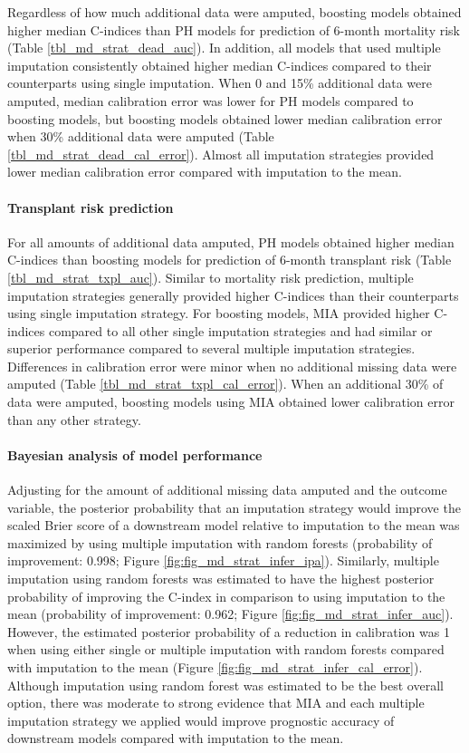 \documentclass{article}
\begin{document}
Regardless of how much additional data were amputed, boosting models
obtained higher median C-indices than PH models for prediction of
6-month mortality risk (Table \ref{tbl_md_strat_dead_auc}). In addition,
all models that used multiple imputation consistently obtained higher
median C-indices compared to their counterparts using single imputation.
When 0 and 15\% additional data were amputed, median calibration error
was lower for PH models compared to boosting models, but boosting models
obtained lower median calibration error when 30\% additional data were
amputed (Table \ref{tbl_md_strat_dead_cal_error}). Almost all imputation
strategies provided lower median calibration error compared with
imputation to the mean.

\paragraph{Transplant risk prediction}

For all amounts of additional data amputed, PH models obtained higher
median C-indices than boosting models for prediction of 6-month
transplant risk (Table \ref{tbl_md_strat_txpl_auc}). Similar to
mortality risk prediction, multiple imputation strategies generally
provided higher C-indices than their counterparts using single
imputation strategy. For boosting models, MIA provided higher C-indices
compared to all other single imputation strategies and had similar or
superior performance compared to several multiple imputation strategies.
Differences in calibration error were minor when no additional missing
data were amputed (Table \ref{tbl_md_strat_txpl_cal_error}). When an
additional 30\% of data were amputed, boosting models using MIA obtained
lower calibration error than any other strategy.

\paragraph{Bayesian analysis of model performance}

Adjusting for the amount of additional missing data amputed and the
outcome variable, the posterior probability that an imputation strategy
would improve the scaled Brier score of a downstream model relative to
imputation to the mean was maximized by using multiple imputation with
random forests (probability of improvement: 0.998; Figure
\ref{fig:fig_md_strat_infer_ipa}). Similarly, multiple imputation using
random forests was estimated to have the highest posterior probability
of improving the C-index in comparison to using imputation to the mean
(probability of improvement: 0.962; Figure
\ref{fig:fig_md_strat_infer_auc}). However, the estimated posterior
probability of a reduction in calibration was 1 when using either single
or multiple imputation with random forests compared with imputation to
the mean (Figure \ref{fig:fig_md_strat_infer_cal_error}). Although
imputation using random forest was estimated to be the best overall
option, there was moderate to strong evidence that MIA and each multiple
imputation strategy we applied would improve prognostic accuracy of
downstream models compared with imputation to the mean.
\end{document}
